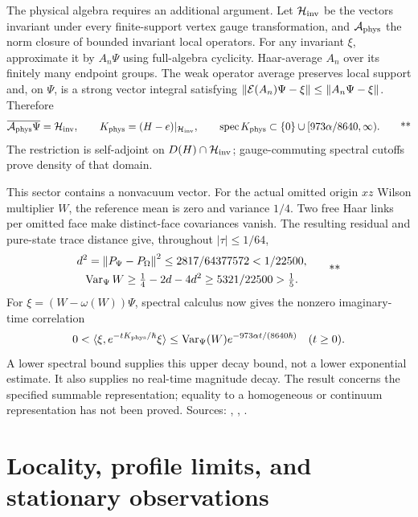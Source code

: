 The physical algebra requires an additional argument. Let
\(\mathcal H_{\rm inv}\) be the vectors invariant under every finite-support
vertex gauge transformation, and \(\mathcal A_{\rm phys}\) the norm closure
of bounded invariant local operators. For any invariant \(\xi\), approximate
it by \(A_n\Psi\) using full-algebra cyclicity. Haar-average \(A_n\) over
its finitely many endpoint groups. The weak operator average preserves
local support and, on \(\Psi\), is a strong vector integral satisfying
\(\left\lVert \mathcal E(A_n)\Psi-\xi\right\rVert\le\left\lVert A_n\Psi-\xi\right\rVert\).
Therefore
\begin{equation}
 \overline{\mathcal A_{\rm phys}\Psi}=\mathcal H_{\rm inv},
 \qquad
 K_{\rm phys}=(H-e)|_{\mathcal H_{\rm inv}},
 \qquad
 \operatorname{spec}K_{\rm phys}\subset
 \{0\}\cup[973\alpha/8640,\infty).
 \qquad\text{**}
 \label{eq:middle-gns}
\end{equation}
The restriction is self-adjoint on \(D(H)\cap\mathcal H_{\rm inv}\);
gauge-commuting spectral cutoffs prove density of that domain.

This sector contains a nonvacuum vector. For the actual omitted origin
\(xz\) Wilson multiplier \(W\), the reference mean is zero and variance
\(1/4\). Two free Haar links per omitted face make distinct-face
covariances vanish. The resulting residual and pure-state trace distance
give, throughout \(|\tau|\le1/64\),
\[
 \begin{gathered}
 d^2=\left\lVert P_\Psi-P_\Omega\right\rVert^2
 \le2817/64377572<1/22500,\\
 \operatorname{Var}_\Psi W\ge\tfrac14-2d-4d^2
 \ge5321/22500>\tfrac15 .
 \end{gathered}
 \qquad\text{**}
\]
For \(\xi=(W-\omega(W))\Psi\), spectral calculus now gives the nonzero
imaginary-time correlation
\[
 0<\langle\xi,e^{-tK_{\rm phys}/\hbar}\xi\rangle
 \le\operatorname{Var}_\Psi(W)e^{-973\alpha t/(8640\hbar)}
 \quad(t\ge0).
\]
A lower spectral bound supplies this upper decay bound, not a lower
exponential estimate. It also supplies no real-time magnitude decay.
The result concerns the specified summable representation; equality to a
homogeneous or continuum representation has not been proved.
Sources: ,
,
.

\section{Locality, profile limits, and stationary observations}
\label{sec:middle-dynamics}

